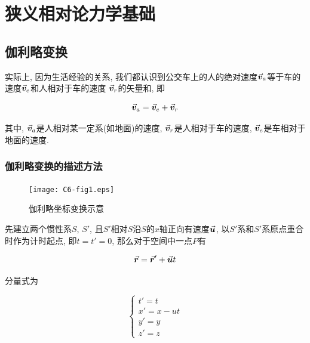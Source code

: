 \chapter{狭义相对论力学基础}

\begin{introduction}
    \item {}
    \item {}
    \item {}
\end{introduction}

\section{伽利略变换}\label{6.1}

实际上, 因为生活经验的关系, 我们都认识到公交车上的人的绝对速度$\va*{v}_a$等于车的速度$\va*{v}_e$和人相对于车的速度 $\va*{v}_r$的矢量和, 即

\begin{equation}
	\va*{v}_a = \va*{v}_e + \va*{v}_r \label{C6-eq1}
\end{equation}

其中, $\va*{v}_a$是人相对某一定系(如地面)的速度, $\va*{v}_r$是人相对于车的速度, $\va*{v}_e$是车相对于地面的速度. 

\subsection{伽利略变换的描述方法}

\begin{figure}[htbp]
	\centering
	\texttt{[image: C6-fig1.eps]}
	\caption{伽利略坐标变换示意}
	\label{C6-fig1}
\end{figure}

先建立两个惯性系$S$, $S'$, 且$S'$相对$S$沿$S$的$x$轴正向有速度$\va*{u}$, 以$S'$系和$S'$系原点重合时作为计时起点, 即$t = t' = 0$, 那么对于空间中一点$P$有

\begin{equation}
	\va*{r} = \va*{r}' + \va*{u}t \label{C6-eq2}
\end{equation}

分量式为

\begin{equation}
	\begin{cases}
		t' = t \\
		x' = x - ut \\
		y' = y \\
		z' = z
	\end{cases}
    \label{C6-eq3}
\end{equation}


